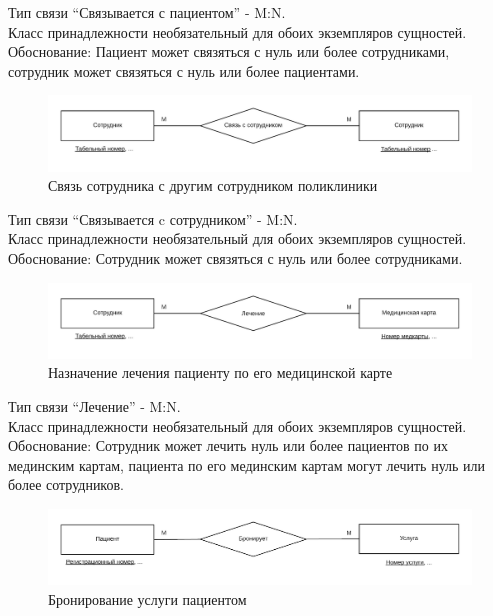 \documentclass[14pt,a4paper,russian]{extreport}
\begin{document}
\noindent Тип связи ``Связывается с пациентом'' - M:N.\\
Класс принадлежности необязательный для обоих экземпляров сущностей.\\
Обоснование: Пациент может связяться с нуль или более сотрудниками, сотрудник может
связяться с нуль или более пациентами.\par

\begin{figure}[h!]
        \includegraphics[width=\textwidth]{emplinkemp}
        \caption{Связь сотрудника с другим сотрудником поликлиники}
        \label{fig:emplinkemp}
\end{figure}

\noindent Тип связи ``Связывается c сотрудником'' - M:N.\\
Класс принадлежности необязательный для обоих экземпляров сущностей.\\
Обоснование: Сотрудник может связяться с нуль или более сотрудниками.\par

\begin{figure}[h!]
        \includegraphics[width=\textwidth]{empcuremedc}
        \caption{Назначение лечения пациенту по его медицинской карте}
        \label{fig:empcuremedc}
\end{figure}

\noindent Тип связи ``Лечение'' - M:N.\\
Класс принадлежности необязательный для обоих экземпляров сущностей.\\
Обоснование: Сотрудник может лечить нуль или более пациентов по их мединским картам,
пациента по его мединским картам могут лечить нуль или более сотрудников.\par

\begin{figure}[h!]
        \includegraphics[width=\textwidth]{patordserv}
        \caption{Бронирование услуги пациентом}
        \label{fig:patordserv}
\end{figure}
\end{document}
